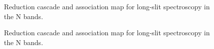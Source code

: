 
\begin{landscape}
\begin{figure}[ht]
  \centering
  \resizebox{\linewidth}{!}{}
  \caption[Reduction cascade and association map for N long-slit
  spectroscopy]{Reduction cascade and association map for long-slit
    spectroscopy in the N bands. }
  \label{Fig:NLssAssomap1}
    \end{figure}
\end{landscape}

\begin{landscape}
\begin{figure}[ht]
  \centering
  \resizebox{\linewidth}{!}{}
  \caption[Reduction cascade and association map for N long-slit
  spectroscopy]{Reduction cascade and association map for long-slit
    spectroscopy in the N bands. }
  \label{Fig:NLssAssomap2}
\end{figure}
\end{landscape}

